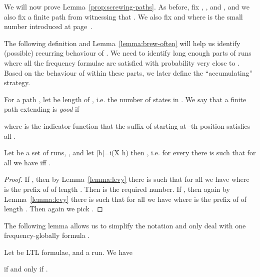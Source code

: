 \documentclass[a4paper,UKenglish]{lipics}
\begin{document}
We will now prove Lemma~\ref{prop:screwing-paths}. As before, fix , , and , and we also fix a finite path  from  witnessing that .
We also fix \label{page:ell} and  where  is the small number introduced at page~\pageref{page:lambda}.

The following definition and Lemma~\ref{lemma:brew-often} will help us identify (possible) recurring behaviour of . We need to identify long enough parts of runs where all the frequency formulae  are satisfied with probability very close to . Based on the behaviour of  within these parts, we later define the ``accumulating'' strategy.

For a path , let  be length of , i.e. the number of states in .
We say that a finite path  extending  is {\em good} 
if 

where  is the indicator function that the suffix of  starting at -th position satisfies all .

\begin{lemma}\label{lemma:prefix-approximate}
Let  be a set of runs, , and let |h|=i(X \mid h) \ge \beta then
, i.e. for every  there is  such that
for all  we have  iff .
\end{lemma}
\begin{proof}
If , then by Lemma~\ref{lemma:levy} there is  such that for all  we have
 where  is the prefix of  of length . Then  is the required number.
If , then again by Lemma~\ref{lemma:levy} there is  such that for all  we have
 where  is the prefix of  of length . Then again we pick .
\end{proof}

The following lemma allows us to simplify the notation and only deal with one frequency-globally formula .
\begin{lemma}\label{lemma:one-formula}
	Let  be LTL formulae, and  a run. We have
	
	if and only if
	.
\end{lemma}
\end{document}
